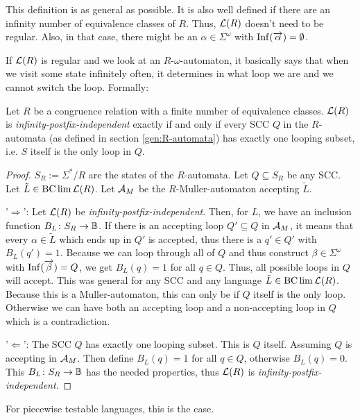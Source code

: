 This definition is as general as possible. It is also well defined if there are an infinity number of equivalence classes of $R$. Thus, $\mathcal{L}(R)$ doesn't need to be regular. Also, in that case, there might be an $\alpha \in \Sigma^\omega$ with $\operatorname{Inf}(\overrightarrow \alpha) = \emptyset$.

If $\mathcal{L}(R)$ is regular and we look at an $R$-$\omega$-automaton, it basically says that when we visit some state infinitely often, it determines in what loop we are and we cannot switch the loop. Formally:

\begin{lemma}
Let $R$ be a congruence relation with a finite number of equivalence classes. $\mathcal{L}(R)$ is \emph{infinity-postfix-independent} exactly if and only if every SCC $Q$ in the $R$-automata (as defined in section \ref{gen:R-automata}) has exactly one looping subset, i.e. $S$ itself is the only loop in $Q$.
\begin{proof}
$S_R := \Sigma^*/R$ are the states of the $R$-automata. Let $Q \subseteq S_R$ be any SCC. Let $\tilde L \in \operatorname{BC} \lim \mathcal{L}(R)$. Let $\mathcal{A}_M$ be the $R$-Muller-automaton accepting $\tilde L$.

'$\Rightarrow$': Let $\mathcal{L}(R)$ be \emph{infinity-postfix-independent}. Then, for $L$, we have an inclusion function $B_L \colon S_R \rightarrow \mathbb{B}$. If there is an accepting loop $Q' \subseteq Q$ in $\mathcal{A}_M$, it means that every $\alpha \in \tilde L$ which ends up in $Q'$ is accepted, thus there is a $q' \in Q'$ with $B_L(q') = 1$. Because we can loop through all of $Q$ and thus construct $\beta \in \Sigma^\omega$ with $\operatorname{Inf}(\overrightarrow \beta) = Q$, we get $B_L(q) = 1$ for all $q \in Q$. Thus, all possible loops in $Q$ will accept. This was general for any SCC and any language $\tilde L \in \operatorname{BC} \lim \mathcal{L}(R)$. Because this is a Muller-automaton, this can only be if $Q$ itself is the only loop. Otherwise we can have both an accepting loop and a non-accepting loop in $Q$ which is a contradiction.

'$\Leftarrow$': The SCC $Q$ has exactly one looping subset. This is $Q$ itself. Assuming $Q$ is accepting in $\mathcal{A}_M$. Then define $B_L(q) = 1$ for all $q \in Q$, otherwise $B_L(q) = 0$. This $B_L \colon S_R \rightarrow \mathbb{B}$ has the needed properties, thus $\mathcal{L}(R)$ is \emph{infinity-postfix-independent}.
\end{proof}
\end{lemma}

For piecewise testable languages, this is the case.

